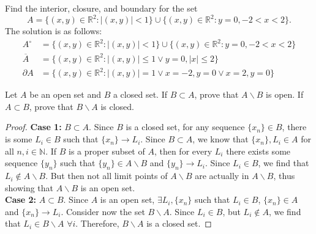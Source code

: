 \documentclass[12pt]{book}
\newcommand{\N}{\mathbb{N}}
\newcommand{\R}{\mathbb{R}}
\newenvironment{exercise}[2][Exercise]{\begin{trivlist}
\item[\hskip \labelsep {\bfseries #1}\hskip \labelsep {\bfseries #2.}]}{\end{trivlist}}
\begin{document}
\begin{exercise}{7.3.4}
Find the interior, closure, and boundary for the set 
\[ A= \{(x, y) \in \R^2 : |(x, y)| < 1\} \cup \{(x, y) \in \R^2 : y = 0, −2 < x < 2\}. \]
The solution is as follows:
    \begin{align*}
    A^\circ &= \{(x, y) \in \R^2 : |(x, y)| < 1\} \cup \{(x, y) \in \R^2 : y = 0, −2 < x < 2\}\\
    \overline{A} &= \{ (x,y) \in \R^2 : |(x,y)| \leq 1 \lor y=0, |x| \leq 2 \} \\
    \partial A &= \{ (x,y) \in \R^2: |(x,y)| = 1 \lor x=-2, y=0  \lor  x=2, y=0  \}
    \end{align*}
\end{exercise}


\begin{exercise}{7.3.6}
Let $A$ be an open set and $B$ a closed set. If $B \subset A$, prove that $A \backslash B$ is
open. If $A \subset B$, prove that $B \backslash A$ is closed.

\begin{proof}
    \textbf{Case 1:} $B\subset A$. Since $B$ is a closed set, for any sequence $\{x_n\} \in B$, there is some $L_i \in B$ such that $\{x_n\} \to L_i$. Since $B \subset A$, we know that $\{x_n\}, L_i \in A$ for all $n,i \in \N$. If $B$ is a proper subset of $A$, then for every $L_i$ there exists some sequence $\{y_n\}$ such that $\{y_n\} \in A\backslash B$ and $\{y_n\} \to L_i$. Since $L_i \in B$, we find that $L_i \notin A\backslash B$. But then not all limit points of $A \backslash B$ are actually in $A \backslash B$, thus showing that $A \backslash B$ is an open set. \\
    \textbf{Case 2:} $A \subset B$. Since $A$ is an open set, $\exists L_i, \{x_n\}$ such that $L_i \in B$, $\{x_n\} \in A$ and $\{x_n\} \to L_i$. Consider now the set $B \backslash A$. Since $L_i \in B$, but $L_i \notin A$, we find that $L_i \in B \backslash A  \, \, \forall i$. Therefore, $B \backslash A$ is a closed set.
\end{proof}
\end{exercise}
\end{document}
